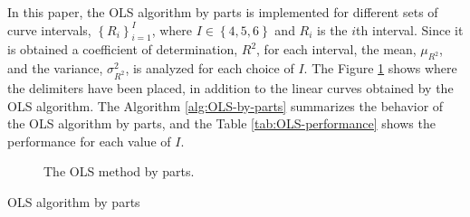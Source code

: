 \documentclass[english]{sobraep}
\begin{document}
In this paper, the OLS algorithm by parts is implemented for different sets of curve intervals, \(\left\{ R_i \right\}_{i=1}^{I}\), where \(I \in \left\{ 4,5,6 \right\}\) and \(R_i\) is the \(i\)th interval. Since it is obtained a coefficient of determination, \(R^2\), for each interval, the mean, \(\mu_{R^2}\), and the variance, \(\sigma_{R^2}^2\), is analyzed for each choice of \(I\). The Figure \ref{fig:OLS-by-parts} shows where the delimiters have been placed, in addition to the linear curves obtained by the OLS algorithm. The Algorithm \ref{alg:OLS-by-parts} summarizes the behavior of the OLS algorithm by parts, and the Table \ref{tab:OLS-performance} shows the performance for each value of \(I\).

\begin{figure}[htp]
    

    
    \caption{The OLS method by parts.}
    \label{fig:OLS-by-parts}
\end{figure}

\begin{algorithm}[!ht]
    \DontPrintSemicolon
      
        {
        }
    
    \caption{OLS algorithm by parts}
    \label{alg:OLS-by-parts}
\end{algorithm}
\end{document}
